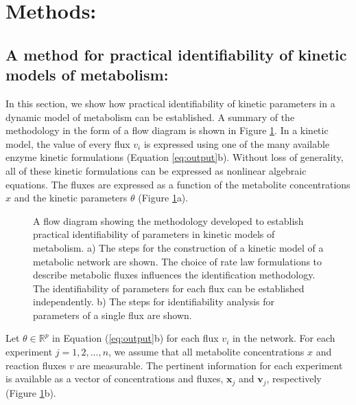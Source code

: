\documentclass[10pt]{article}
\begin{document}
\section{Methods:}	
\subsection{A method for practical identifiability of kinetic models of metabolism:}\label{sec:ident}
In this section, we show how practical identifiability of kinetic parameters in a dynamic model of metabolism can be established. A summary of the methodology in the form of a flow diagram is shown in Figure \ref{fig:ident-flowchart}. In a kinetic model, the value of every flux $v_i$ is expressed using one of the many available enzyme kinetic formulations (Equation \ref{eq:output}b). Without loss of generality, all of these kinetic formulations can be expressed as nonlinear algebraic equations. The fluxes are expressed as a function of the metabolite concentrations $x$ and the kinetic parameters $\theta$ (Figure \ref{fig:ident-flowchart}a). 

\begin{figure}[!tbhp]
	\caption{A flow diagram showing the methodology developed to establish practical identifiability of parameters in kinetic models of metabolism. a) The steps for the construction of a kinetic model of a metabolic network are shown. The choice of rate law formulations to describe metabolic fluxes influences the identification methodology. The identifiability of parameters for each flux can be established independently. b) The steps for identifiability analysis for parameters of a single flux are shown.}\label{fig:ident-flowchart}
\end{figure}	

Let $\theta \in \mathbb{R}^p$ in Equation (\ref{eq:output}b) for each flux $v_i$ in the network. For each experiment $j = {1, 2, ..., n}$, we assume that all metabolite concentrations $x$ and reaction fluxes $v$ are measurable. The pertinent information for each experiment is available as a vector of concentrations and fluxes, $\mathbf{x}_j$ and $\mathbf{v}_j$, respectively (Figure \ref{fig:ident-flowchart}b). 
\end{document}
